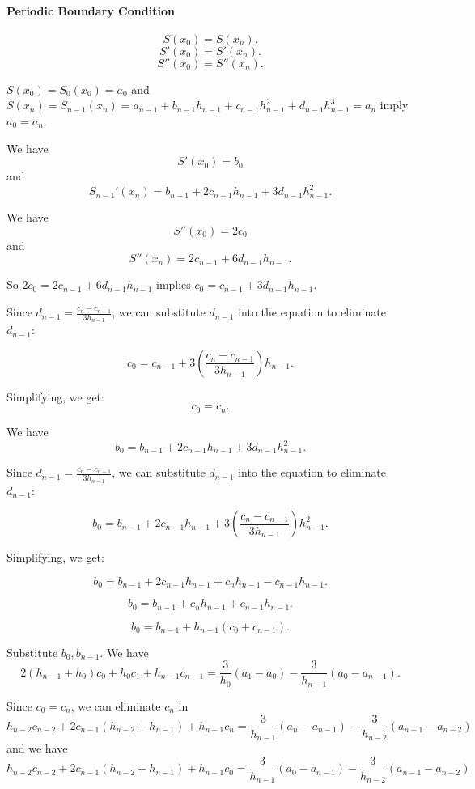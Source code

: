 \documentclass[a4paper]{article}
\begin{document}
\begin{sloppypar}
\paragraph*{Periodic Boundary Condition}
\[ S(x_0) = S(x_n). \]
\[ S'(x_0) = S'(x_n). \]
\[ S''(x_0) = S''(x_n). \]

\( S(x_0) = S_0(x_0) = a_0 \) and \( S(x_n) = S_{n-1}(x_n) = a_{n-1}+b_{n-1}h_{n-1}+c_{n-1}h_{n-1}^2+d_{n-1}h_{n-1}^3=a_n \) imply \( a_0=a_n \).

We have \[ S'(x_0)=b_0 \] and \[S_{n-1}'(x_n) = b_{n-1}+2c_{n-1}h_{n-1}+3d_{n-1}h_{n-1}^2. \]

We have \[ S''(x_0)=2c_0 \] and \[ S''(x_n) = 2c_{n-1}+6d_{n-1}h_{n-1}. \]

So \( 2c_0 = 2c_{n-1}+6d_{n-1}h_{n-1} \) implies \( c_0 = c_{n-1}+3d_{n-1}h_{n-1} \).

Since \( d_{n-1} = \frac{c_{n} - c_{n-1}}{3h_{n-1}} \), we can substitute \( d_{n-1} \) into the equation to eliminate \( d_{n-1} \):

\[ c_0 = c_{n-1} + 3 \left( \frac{c_{n} - c_{n-1}}{3h_{n-1}} \right) h_{n-1}. \]

Simplifying, we get:
\[ c_0 = c_n. \]

We have \[ b_0 = b_{n-1}+2c_{n-1}h_{n-1}+3d_{n-1}h_{n-1}^2. \]

Since \( d_{n-1} = \frac{c_{n} - c_{n-1}}{3h_{n-1}} \), we can substitute \( d_{n-1} \) into the equation to eliminate \( d_{n-1} \):

\[ b_0 = b_{n-1} + 2c_{n-1}h_{n-1} + 3 \left( \frac{c_{n} - c_{n-1}}{3h_{n-1}} \right) h_{n-1}^2. \]

Simplifying, we get:

\[ b_0 = b_{n-1} + 2c_{n-1}h_{n-1} + c_{n}h_{n-1} - c_{n-1}h_{n-1}. \]

\[ b_0 = b_{n-1} + c_{n}h_{n-1} + c_{n-1}h_{n-1}. \]

\[ b_0 = b_{n-1} + h_{n-1}(c_{0} + c_{n-1}). \]

Substitute \( b_0, b_{n-1} \). We have
\[
2(h_{n-1}+h_0)c_{0}+h_0c_1+h_{n-1}c_{n-1}=\frac3{h_0}(a_{1}-a_0)-\frac3{h_{n-1}}(a_0-a_{n-1}).
\]

Since \( c_0 = c_n \), we can eliminate \( c_{n} \) in
$$
h_{n-2}c_{n-2}+2c_{n-1}(h_{n-2}+h_{n-1})+h_{n-1}c_{n}=\frac3{h_{n-1}}(a_{n}-a_{n-1})-\frac3{h_{n-2}}(a_{n-1}-a_{n-2})
$$
and we have
$$
h_{n-2}c_{n-2}+2c_{n-1}(h_{n-2}+h_{n-1})+h_{n-1}c_{0}=\frac3{h_{n-1}}(a_{0}-a_{n-1})-\frac3{h_{n-2}}(a_{n-1}-a_{n-2})
$$


\end{sloppypar}
\end{document}
